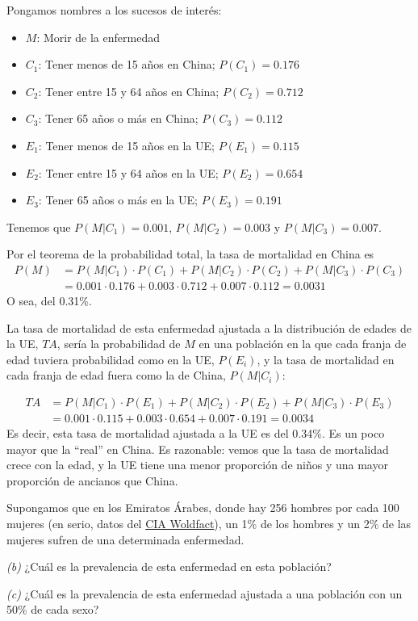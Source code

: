 \documentclass[
]{book}
\theoremstyle{definition}
\theoremstyle{definition}
\theoremstyle{definition}
\theoremstyle{definition}
\theoremstyle{remark}
\begin{document}
Pongamos nombres a los sucesos de interés:

\begin{itemize}
\item
  \(M\): Morir de la enfermedad
\item
  \(C_1\): Tener menos de 15 años en China; \(P(C_1)=0.176\)
\item
  \(C_2\): Tener entre 15 y 64 años en China; \(P(C_2)=0.712\)
\item
  \(C_3\): Tener 65 años o más en China; \(P(C_3)=0.112\)
\item
  \(E_1\): Tener menos de 15 años en la UE; \(P(E_1)=0.115\)
\item
  \(E_2\): Tener entre 15 y 64 años en la UE; \(P(E_2)=0.654\)
\item
  \(E_3\): Tener 65 años o más en la UE; \(P(E_3)=0.191\)
\end{itemize}

Tenemos que \(P(M|C_1)=0.001\), \(P(M|C_2)=0.003\) y \(P(M|C_3)=0.007\).

Por el teorema de la probabilidad total, la tasa de mortalidad en China es
\[
\begin{array}{rl}
P(M)\!\!\!\! &=P(M|C_1)\cdot P(C_1)+P(M|C_2)\cdot P(C_2)+P(M|C_3)\cdot P(C_3)\\
& =0.001\cdot 0.176+0.003\cdot 0.712+0.007\cdot 0.112=0.0031
\end{array}
\]
O sea, del 0.31\%.

La tasa de mortalidad de esta enfermedad ajustada a la distribución de edades de la UE, \(\mathit{TA}\), sería la probabilidad de \(M\) en una población en la que cada franja de edad tuviera probabilidad como en la UE, \(P(E_i)\), y la tasa de mortalidad en cada franja de edad fuera como la de China, \(P(M|C_i)\):

\[
\begin{array}{rl}
\mathit{TA}\!\!\!\!  & =P(M|C_1)\cdot P(E_1)+P(M|C_2)\cdot P(E_2)+P(M|C_3)\cdot P(E_3)\\
& =0.001\cdot 0.115+0.003\cdot 0.654+0.007\cdot 0.191=0.0034
\end{array}
\]
Es decir, esta tasa de mortalidad ajustada a la UE es del 0.34\%. Es un poco mayor que la ``real'' en China. Es razonable: vemos que la tasa de mortalidad crece con la edad, y la UE tiene una menor proporción de niños y una mayor proporción de ancianos que China.

\begin{rmdexercici}
Supongamos que en los Emiratos Árabes, donde hay 256 hombres por cada 100 mujeres (en serio, datos del \href{https://www.cia.gov/library/publications/the-world-factbook/geos/print_ae.html}{CIA Woldfact}), un 1\% de los hombres y un 2\% de las mujeres sufren de una determinada enfermedad.

\emph{(b)} ¿Cuál es la prevalencia de esta enfermedad en esta población?

\emph{(c)} ¿Cuál es la prevalencia de esta enfermedad ajustada a una población con un 50\% de cada sexo?
\end{rmdexercici}
\end{document}
